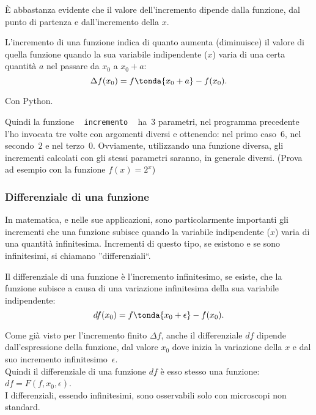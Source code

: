 È abbastanza evidente che il valore dell'incremento dipende dalla funzione, 
dal punto di partenza e dall'incremento della $x$.

\begin{definizione}
 L'incremento di una funzione indica di quanto aumenta (diminuisce) il valore 
di 
quella funzione quando la sua variabile indipendente (\(x\)) varia di una certa 
quantità $a$ nel passare da $x_0$ a $x_0+a$:
\[
\Delta f(x_0) = f \tonda{x_0 + a} - f(x_0).
\]
\end{definizione}


\ifcoding
Con Python.
\fi

Quindi la funzione ~ \texttt{incremento} ~ ha~$3$ 
parametri, nel programma precedente l'ho invocata tre volte con argomenti 
diversi e ottenendo: nel primo caso~$6$, nel secondo~$2$ e nel terzo~$0$. 
Ovviamente, utilizzando una funzione diversa, gli incrementi calcolati con 
gli stessi parametri saranno, in generale diversi. (Prova ad esempio 
con la funzione \(f(x)= 2^x\))


\subsubsection{Differenziale di una funzione}
\label{subsubsec:diff01_parteprincipale}

In matematica, e nelle sue applicazioni, sono particolarmente importanti 
gli incrementi che una funzione subisce quando la variabile 
indipendente (\(x\)) varia di una quantità infinitesima. Incrementi di 
questo tipo, se esistono e se sono infinitesimi, si chiamano ''differenziali``.

\begin{definizione}
 Il differenziale di una funzione è l'incremento infinitesimo, se esiste, 
 che la funzione subisce a causa di una variazione infinitesima della sua 
variabile indipendente:
\[df(x_0) = f \tonda{x_0 + \epsilon} - f(x_0).\]
\end{definizione}

Come già visto per l'incremento finito $\Delta f$, anche il differenziale $df$ 
dipende dall'espressione della funzione, dal valore $x_0$ dove inizia la 
variazione della $x$ e dal suo incremento infinitesimo~$\epsilon$.\\
Quindi il differenziale di una funzione \(df\) è esso stesso  una funzione:
\(df=F(f, x_0, \epsilon)\).\\
I differenziali, essendo infinitesimi, sono osservabili solo con 
microscopi non standard.\\

